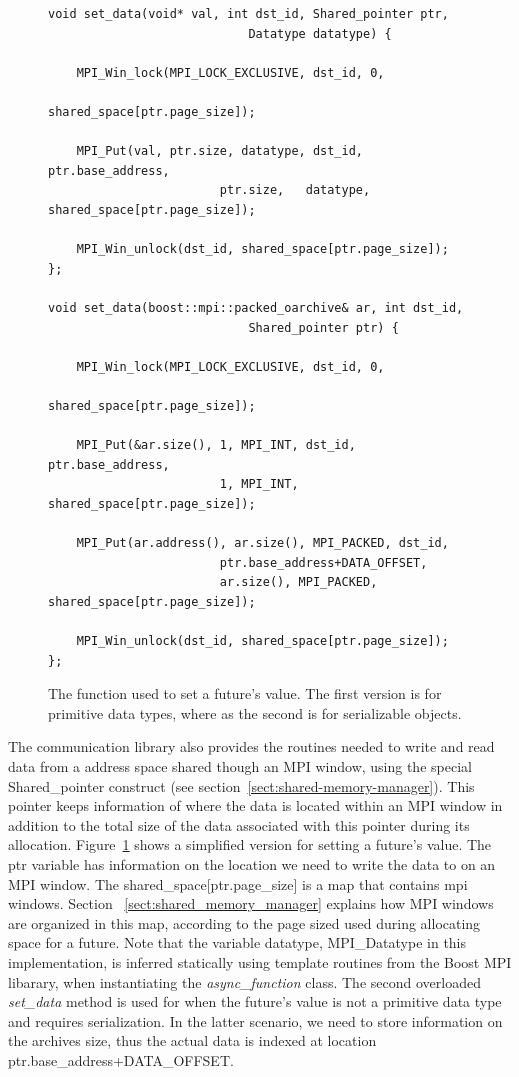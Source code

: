 \begin{figure}[here]
\begin{lstlisting}
void set_data(void* val, int dst_id, Shared_pointer ptr, 
							Datatype datatype) {

    MPI_Win_lock(MPI_LOCK_EXCLUSIVE, dst_id, 0, 
								shared_space[ptr.page_size]);

    MPI_Put(val, ptr.size, datatype, dst_id, ptr.base_address, 
						ptr.size,	datatype, shared_space[ptr.page_size]);

    MPI_Win_unlock(dst_id, shared_space[ptr.page_size]);
};

void set_data(boost::mpi::packed_oarchive& ar, int dst_id, 
							Shared_pointer ptr) {

    MPI_Win_lock(MPI_LOCK_EXCLUSIVE, dst_id, 0, 
								shared_space[ptr.page_size]);

    MPI_Put(&ar.size(), 1, MPI_INT, dst_id, ptr.base_address,
						1, MPI_INT, shared_space[ptr.page_size]);

    MPI_Put(ar.address(), ar.size(), MPI_PACKED, dst_id, 
						ptr.base_address+DATA_OFFSET,
						ar.size(), MPI_PACKED, shared_space[ptr.page_size]);

    MPI_Win_unlock(dst_id, shared_space[ptr.page_size]);
};
\end{lstlisting}
\caption{The function used to set a future's value.  The first version is for primitive data types, 
where as the second is for serializable objects.}
\label{lst:set_data}
\end{figure}

The communication library also provides the routines needed to write and read data from a address space shared
though an MPI window, using the special Shared\_pointer construct (see section~\ref{sect:shared-memory-manager}).  
This pointer keeps information of where the data is located within an MPI window in addition to the total size of the data associated with this pointer during its allocation.  Figure~\ref{lst:set_data} shows a simplified version for 
setting a future's value.  The ptr variable has information on the location we need to write the data to on an MPI 
window.  The shared\_space[ptr.page\_size] is a map that contains mpi windows.  Section
~\ref{sect:shared_memory_manager} explains how MPI windows are organized in this map, according to the 
page sized used during allocating space for a future.  Note that the variable datatype, MPI\_Datatype in this
implementation, is inferred statically using template routines from the Boost MPI libarary,
when instantiating the \emph{async\_function} class.  The second overloaded \emph{set\_data} method is used for
when the future's value is not a primitive data type and requires serialization.  In the latter scenario, we
need to store information on the archives size, thus the actual data is indexed at location 
ptr.base\_address+DATA\_OFFSET.

